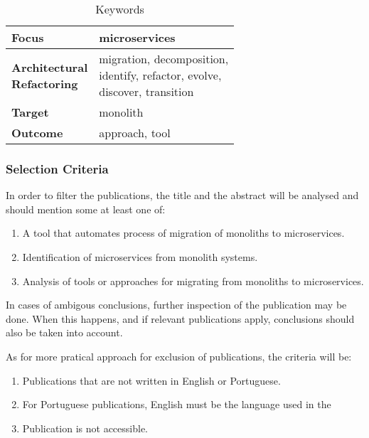 \documentclass{article}
\newcommand{\wrap}[1]{\parbox{.33\linewidth}{\vspace{1.5mm}#1\vspace{1mm}}}
\begin{document}
\begin{table}[H]
  \caption{Keywords}
  \label{tab:keywords}
  \begin{center}
    \begin{tabular}[c]{l|l}
      {\textbf{Focus}} &
      microservices \\
      \hline
      \wrap{{\textbf{Architectural\\Refactoring}}} &
      \wrap{
        migration, decomposition,\\
        identify, refactor, evolve,\\
        discover, transition
      } \\
      \hline
      {\textbf{Target}} &
      monolith \\
      \hline
      {\textbf{Outcome}} &
      approach, tool \\
    \end{tabular}
  \end{center}
\end{table}


\subsubsection{Selection Criteria}

In order to filter the publications, the title and the abstract will be
analysed and should mention some at least one of:

\begin{enumerate}[{IC}1.]
  \item A tool that automates process of migration of monoliths to
    microservices.
  \item Identification of microservices from monolith systems.
  \item Analysis of tools or approaches for migrating from monoliths to
    microservices.
\end{enumerate}

In cases of ambigous conclusions, further inspection of the publication may
be done. When this happens, and if relevant publications apply, conclusions
should also be taken into account.

As for more pratical approach for exclusion of publications, the criteria
will be:

\begin{enumerate}[{EC}1.]
  \item Publications that are not written in English or Portuguese.
  \item For Portuguese publications, English must be the language used in the
  \item Publication is not accessible.
\end{enumerate}
\end{document}
